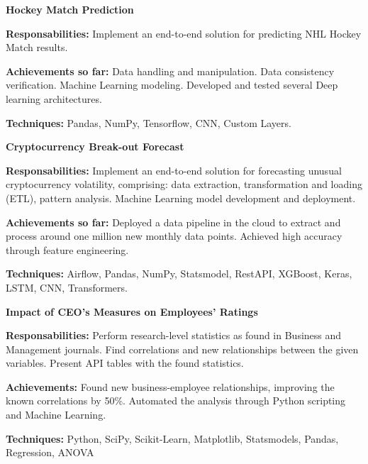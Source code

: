 \documentclass[10pt]{article}
\newenvironment{outerlist}[1][\enskip\textbullet]%
{\begin{itemize}[#1]}{\end{itemize}%
	\vspace{-.6\baselineskip}}
\newenvironment{innerlist}[1][\enskip\textbullet]%
{\begin{compactitem}[#1]}{\end{compactitem}}
\begin{document}
		\begin{outerlist}
			
			
			\item \textbf{Hockey Match Prediction}
			
			
			\begin{innerlist}[-]
				\item \textbf{Responsabilities:} Implement an end-to-end solution for predicting NHL Hockey Match results.
				\item \textbf{Achievements so far:} Data handling and manipulation. Data consistency verification. Machine Learning modeling. Developed and tested several Deep learning architectures.
				\item \textbf{Techniques:} Pandas, NumPy, Tensorflow, CNN, Custom Layers.
			\end{innerlist}
			
			\item \textbf{Cryptocurrency Break-out Forecast}
			
			
			\begin{innerlist}[-]
				\item \textbf{Responsabilities:} Implement an end-to-end solution for forecasting unusual cryptocurrency volatility, comprising: data extraction, transformation and loading (ETL), pattern analysis. Machine Learning model development and deployment.
				\item \textbf{Achievements so far:} Deployed a data pipeline in the cloud to extract and process around one million new monthly data points. Achieved high accuracy through feature engineering. 
				\item \textbf{Techniques:} Airflow, Pandas, NumPy, Statsmodel, RestAPI, XGBoost, Keras, LSTM, CNN, Transformers.
			\end{innerlist}
			

			
			\item \textbf{Impact of CEO's Measures on Employees' Ratings}
			
\begin{innerlist}[-]
	\item \textbf{Responsabilities:} Perform research-level statistics as found in Business and Management journals. Find correlations and new relationships between the given variables. Present API tables with the found statistics.
	\item \textbf{Achievements:} Found new business-employee relationships, improving the known correlations by 50\%. 	Automated the analysis through Python scripting and Machine Learning.
	\item \textbf{Techniques:} Python, SciPy, Scikit-Learn, Matplotlib, Statsmodels, Pandas, Regression, ANOVA
\end{innerlist}



\end{outerlist}
\end{document}
